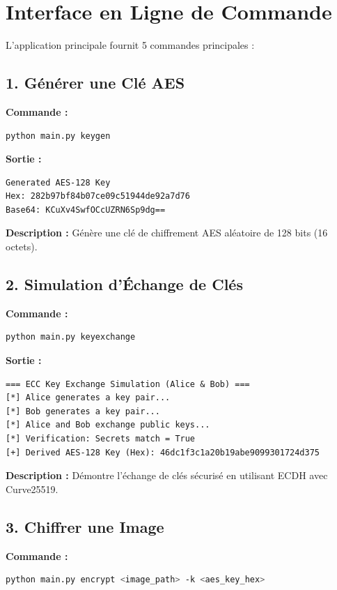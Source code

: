 \documentclass[12pt,a4paper]{report}
\begin{document}
\section{Interface en Ligne de Commande}

L'application principale fournit 5 commandes principales :

\subsection{1. Générer une Clé AES}

\textbf{Commande :}
\begin{lstlisting}[language=bash]
python main.py keygen
\end{lstlisting}

\textbf{Sortie :}
\begin{lstlisting}
Generated AES-128 Key
Hex: 282b97bf84b07ce09c51944de92a7d76
Base64: KCuXv4SwfOCcUZRN6Sp9dg==
\end{lstlisting}

\textbf{Description :} Génère une clé de chiffrement AES aléatoire de 128 bits (16 octets).

\subsection{2. Simulation d'Échange de Clés}

\textbf{Commande :}
\begin{lstlisting}[language=bash]
python main.py keyexchange
\end{lstlisting}

\textbf{Sortie :}
\begin{lstlisting}
=== ECC Key Exchange Simulation (Alice & Bob) ===
[*] Alice generates a key pair...
[*] Bob generates a key pair...
[*] Alice and Bob exchange public keys...
[*] Verification: Secrets match = True
[+] Derived AES-128 Key (Hex): 46dc1f3c1a20b19abe9099301724d375
\end{lstlisting}

\textbf{Description :} Démontre l'échange de clés sécurisé en utilisant ECDH avec Curve25519.

\subsection{3. Chiffrer une Image}

\textbf{Commande :}
\begin{lstlisting}[language=bash]
python main.py encrypt <image_path> -k <aes_key_hex>
\end{lstlisting}
\end{document}
